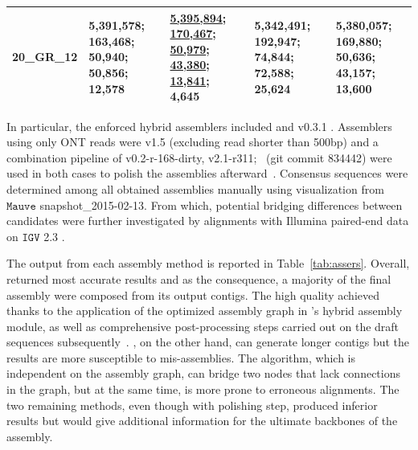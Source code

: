 \begin{landscape}
\begin{table}[!hpt]
\begin{tabular}{cp{4cm}p{4cm}p{4cm}p{4cm}}
20\_GR\_12              & \cellcolor{Gray}\textbf{5,391,578}; \textbf{163,468}; \textbf{50,940}; 50,856; 12,578  & \underline{\textbf{5,395,894}}; \underline{\textbf{170,467}}; \underline{\textbf{50,979}}; \underline{\textbf{43,380}}; \underline{\textbf{13,841}}; 4,645     & \cellcolor{Gray}5,342,491; \textbf{192,947}; 74,844; 72,588; 25,624    & \textbf{5,380,057}; \textbf{169,880}; \textbf{50,636}; \textbf{43,157}; 13,600  \\ \hline
\end{tabular}
\end{table}
\end{landscape}

In particular, the enforced hybrid assemblers included \npscarf{} and \unicycler{} v0.3.1 \cite{Wick2017unicycler}. Assemblers using only ONT reads were \canu{} v1.5 \cite{Koren2017canu} (excluding read shorter than 500bp) and a combination pipeline of \miniasm{} v0.2-r-168-dirty, \minimap{} v2.1-r311; \racon{}~(git commit 834442) were used in both cases to polish the assemblies afterward~\cite{Vaser2017racon}. Consensus sequences were determined among all obtained assemblies manually using visualization from $\mathtt{Mauve}$ \cite{Darling2011mauve} snapshot\_2015-02-13. 
From which, potential bridging differences between candidates were further investigated by alignments with Illumina paired-end data on $\mathtt{IGV}$ 2.3 \cite{Robinson2011IGV,Thorvaldsdottir2013IGV}. 

The output from each assembly method is reported in Table~\ref{tab:assers}. 
Overall, \unicycler{} returned most accurate results and as the consequence, a majority of the final assembly were composed from its output contigs. The high quality achieved thanks to the application of the optimized assembly graph in \unicycler{}'s hybrid assembly module, as well as comprehensive post-processing steps carried out on the draft sequences subsequently~\cite{Wick2017unicycler}. 
\npscarf{}, on the other hand, can generate longer contigs but the results are more susceptible to mis-assemblies. The algorithm, which is independent on the assembly graph, can bridge two nodes that lack connections in the graph, but at the same time, is more prone to erroneous alignments. 
The two remaining methods, even though with polishing step, produced inferior results but would give additional information for the ultimate backbones of the assembly.

